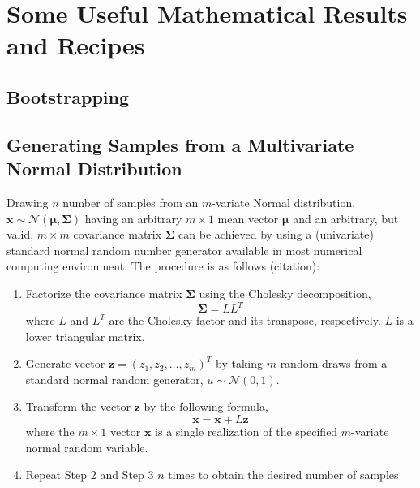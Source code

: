 \chapter{Some Useful Mathematical Results and Recipes}\label{app:math_results}

\section{Bootstrapping}\label{app:bootstrapping}

\section{Generating Samples from a Multivariate Normal Distribution}

Drawing $n$ number of samples from an $m$-variate Normal distribution, $\boldsymbol{x} \sim \mathcal{N}(\boldsymbol{\mu}, \boldsymbol{\Sigma})$ having an arbitrary $m \times 1$ mean vector $\boldsymbol{\mu}$ and an arbitrary, but valid, $m \times m$ covariance matrix $\boldsymbol{\Sigma}$ can be achieved by using a (univariate) standard normal random number generator available in most numerical computing environment.
The procedure is as follows (citation):

\begin{enumerate}
	\item Factorize the covariance matrix $\boldsymbol{\Sigma}$ using the Cholesky decomposition,
	\begin{equation}
	\boldsymbol{\Sigma} = L L^T
	\end{equation}
	where $L$ and $L^T$ are the Cholesky factor and its transpose, respectively. $L$ is a lower triangular matrix.
	
	\item Generate vector $\mathbf{z}=(z_1, z_2, \dots, z_m)^T$ by taking $m$ random draws from a standard normal random generator, $u \sim \mathcal{N}(0, 1)$.
	
	\item Transform the vector $\mathbf{z}$ by the following formula,
	\begin{equation}
	\mathbf{x} = \boldsymbol{x} + L \boldsymbol{z}
	\end{equation}
	where the $m \times 1$ vector $\mathbf{x}$ is a single realization of the specified $m$-variate normal random variable.
	
	\item Repeat Step $2$ and Step $3$ $n$ times to obtain the desired number of samples 
\end{enumerate}

